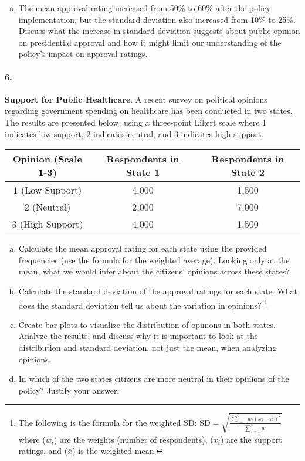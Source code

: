 \documentclass{article}
\begin{document}
\begin{enumerate}[a)]
    \item The mean approval rating increased from 50\% to 60\% after the policy implementation, but the standard deviation also increased from 10\% to 25\%. Discuss what the increase in standard deviation suggests about public opinion on presidential approval and how it might limit our understanding of the policy's impact on approval ratings.
\end{enumerate}

\paragraph{6.} \textbf{Support for Public Healthcare}. A recent survey on political opinions regarding government spending on healthcare has been conducted in two states. The results are presented below, using a three-point Likert scale where 1 indicates low support, 2 indicates neutral, and 3 indicates high support.

\begin{center} 
\begin{tabular}{|c|c|c|} 
\hline Opinion (Scale 1-3) & Respondents in State 1 & Respondents in State 2 \\
\hline 1 (Low Support) & 4,000 & 1,500 \\ 
2 (Neutral) & 2,000 & 7,000 \\
3 (High Support) & 4,000 & 1,500 \\
\hline 
\end{tabular} 
\end{center}

\begin{enumerate}[a)]
    \item Calculate the mean approval rating for each state using the provided frequencies (use the formula for the weighted average). Looking only at the mean, what we would infer about the citizens' opinions across these states? 
    \item Calculate the standard deviation of the approval ratings for each state. What does the standard deviation tell us about the variation in opinions? \footnote{The following is the formula for the weighted SD: $\text{SD} = \sqrt{\frac{\sum_{i=1}^n w_i (x_i - \bar{x})^2}{\sum_{i=1}^n w_i}} $ where ($w_i$) are the weights (number of respondents), ($x_i$) are the support ratings, and ($\bar{x}$) is the weighted mean.}
    \item Create bar plots to visualize the distribution of opinions in both states. Analyze the results, and discuss why it is important to look at the distribution and standard deviation, not just the mean, when analyzing opinions.
    \item In which of the two states citizens are more neutral in their opinions of the policy? Justify your answer.
\end{enumerate}
\end{document}

